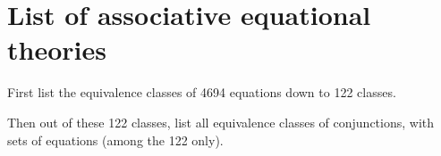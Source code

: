 \section{List of associative equational theories}
\label{app:alltheories}

First list the equivalence classes of 4694 equations down to 122 classes.

Then out of these 122 classes, list all equivalence classes of conjunctions, with sets of equations (among the 122 only).
